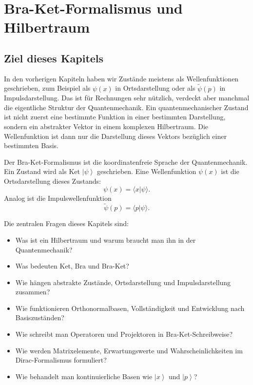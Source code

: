 \providecommand{\ket}[1]{\left|#1\right\rangle}
\providecommand{\bra}[1]{\left\langle#1\right|}

\chapter{Bra-Ket-Formalismus und Hilbertraum}

\section{Ziel dieses Kapitels}

In den vorherigen Kapiteln haben wir Zustände meistens als Wellenfunktionen geschrieben, zum Beispiel als $\psi(x)$ in Ortsdarstellung oder als $\tilde\psi(p)$ in Impulsdarstellung. Das ist für Rechnungen sehr nützlich, verdeckt aber manchmal die eigentliche Struktur der Quantenmechanik. Ein quantenmechanischer Zustand ist nicht zuerst eine bestimmte Funktion in einer bestimmten Darstellung, sondern ein abstrakter Vektor in einem komplexen Hilbertraum. Die Wellenfunktion ist dann nur die Darstellung dieses Vektors bezüglich einer bestimmten Basis.

\begin{conceptbox}
Der Bra-Ket-Formalismus ist die koordinatenfreie Sprache der Quantenmechanik. Ein Zustand wird als Ket $\ket{\psi}$ geschrieben. Eine Wellenfunktion $\psi(x)$ ist die Ortsdarstellung dieses Zustands:
\[
    \psi(x)=\langle x|\psi\rangle.
\]
Analog ist die Impulswellenfunktion
\[
    \tilde\psi(p)=\langle p|\psi\rangle.
\]
\end{conceptbox}

Die zentralen Fragen dieses Kapitels sind:
\begin{itemize}
    \item Was ist ein Hilbertraum und warum braucht man ihn in der Quantenmechanik?
    \item Was bedeuten Ket, Bra und Bra-Ket?
    \item Wie hängen abstrakte Zustände, Ortsdarstellung und Impulsdarstellung zusammen?
    \item Wie funktionieren Orthonormalbasen, Vollständigkeit und Entwicklung nach Basiszuständen?
    \item Wie schreibt man Operatoren und Projektoren in Bra-Ket-Schreibweise?
    \item Wie werden Matrixelemente, Erwartungswerte und Wahrscheinlichkeiten im Dirac-Formalismus formuliert?
    \item Wie behandelt man kontinuierliche Basen wie $\ket{x}$ und $\ket{p}$?
\end{itemize}

